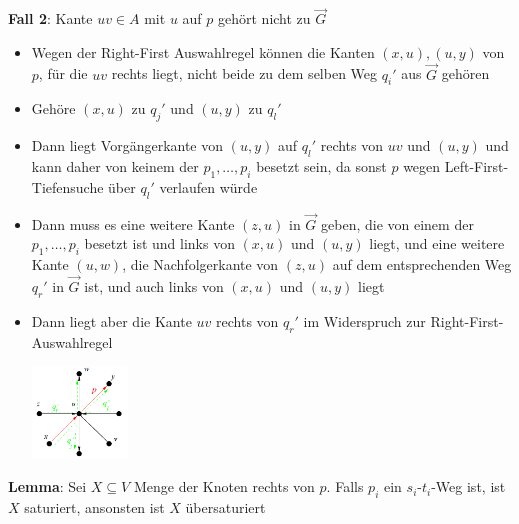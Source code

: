 \begin{itemize}
	\textbf{Fall 2}: Kante $uv\in A$ mit $u$ auf $p$ gehört nicht zu $\overrightarrow{G}$
	\begin{itemize}
		\item Wegen der Right-First Auswahlregel können die Kanten $(x,u),(u,y)$ von $p$, für die $uv$ rechts liegt, nicht beide zu dem selben Weg $q_i'$ aus $\overrightarrow{G}$ gehören
		\item Gehöre $(x,u)$ zu $q_j'$ und $(u,y)$ zu $q_l'$
		\item Dann liegt Vorgängerkante von $(u,y)$ auf $q_l'$ rechts von $uv$ und $(u,y)$ und kann daher von keinem der $p_1,\ldots,p_i$ besetzt sein, da sonst $p$ wegen Left-First-Tiefensuche über $q_l'$ verlaufen würde
		\item Dann muss es eine weitere Kante $(z, u)$ in $\overrightarrow{G}$ geben, die von einem der $p_1,\ldots,p_i$ besetzt ist und links von $(x,u)$ und $(u,y)$ liegt, und eine weitere Kante $(u,w)$, die Nachfolgerkante von $(z, u)$ auf dem entsprechenden Weg $q_r'$ in $\overrightarrow{G}$ ist, und auch links von $(x,u)$ und $(u,y)$ liegt
		\item Dann liegt aber die Kante $uv$ rechts von $q_r'$ im Widerspruch zur Right-First-Auswahlregel
		\begin{center}
			\includegraphics[width=0.2\textwidth]{images/s8.png}
		\end{center}
	\end{itemize}
\end{itemize}

\textbf{Lemma}: Sei $X\subseteq V$ Menge der Knoten rechts von $p$. Falls $p_i$ ein $s_i$-$t_i$-Weg ist, ist $X$
saturiert, ansonsten ist $X$ übersaturiert

